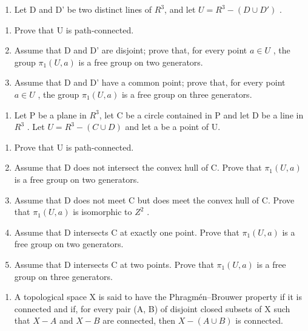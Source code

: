 \begin{enumerate}
\def\labelenumi{\arabic{enumi})}
\setcounter{enumi}{12}
\tightlist
\item
   Let D and D' be two distinct lines of \(R^{3}\), and let \(U = R^{3} - (D \cup D')\) .
\end{enumerate}

\begin{enumerate}
\def\labelenumi{\alph{enumi})}
\item
  Prove that U is path-connected.
\item
  Assume that D and D' are disjoint; prove that, for every point \(a \in U\) , the group \(\pi_{1}(U, a)\) is a free group on two generators.
\item
  Assume that D and D' have a common point; prove that, for every point \(a \in U\) , the group \(\pi_{1}(U, a)\) is a free group on three generators.
\end{enumerate}

\begin{enumerate}
\def\labelenumi{\arabic{enumi})}
\setcounter{enumi}{13}
\tightlist
\item
   Let P be a plane in \(R^{3}\), let C be a circle contained in P and let D be a line in \(R^{3}\) . Let \(U = R^{3} - (C \cup D)\) and let a be a point of U.
\end{enumerate}

\begin{enumerate}
\def\labelenumi{\alph{enumi})}
\item
  Prove that U is path-connected.
\item
  Assume that D does not intersect the convex hull of C. Prove that \(\pi_{1}(U,a)\) is a free group on two generators.
\item
  Assume that D does not meet C but does meet the convex hull of C. Prove that \(\pi_{1}(U,a)\) is isomorphic to \(Z^{2}\) .
\item
  Assume that D intersects C at exactly one point. Prove that \(\pi_{1}(U,a)\) is a free group on two generators.
\item
  Assume that D intersects C at two points. Prove that \(\pi_{1}(U,a)\) is a free group on three generators.
\end{enumerate}

\begin{enumerate}
\def\labelenumi{\arabic{enumi})}
\setcounter{enumi}{14}
\tightlist
\item
  A topological space X is said to have the Phragmén–Brouwer property if it is connected and if, for every pair (A, B) of disjoint closed subsets of X such that \(X-A\) and \(X-B\) are connected, then \(X-(A \cup B)\) is connected.
\end{enumerate}

